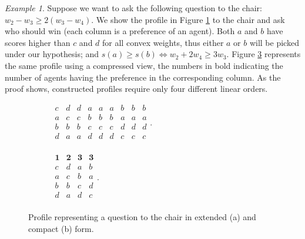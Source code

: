 \documentclass[runningheads]{llncs}
\theoremstyle{remark}
\newtheorem*{example*}{Example}
\begin{document}
\begin{example*}
	Suppose we want to ask the following question to the chair: $w_{2} - w_{3} ≥ 2 (w_{3} - w_{4})$. We show the profile in Figure \ref{fig:profileQstComm} to the chair and ask who should win (each column is a preference of an agent).	Both $a$ and $b$ have scores higher than $c$ and $d$ for all convex weights, thus either $a$ or $b$ will be picked under our hypothesis; and $s(a) ≥ s(b) ⇔ w_2 + 2 w_4 ≥ 3 w_3$.
	Figure \ref{fig:profileQstCommCompact} represents the same profile using a compressed view, the numbers in bold indicating the number of agents having the preference in the corresponding column. As the proof shows, constructed profiles require only four different linear orders.
	\begin{figure}
		\centering
		\begin{subfigure}[b]{0.49\textwidth}
			\begin{center}
				$
				\begin{array}{ccccccccc}
					c&d&d&a&a&a&b&b&b\\
					a&c&c&b&b&b&a&a&a\\
					b&b&b&c&c&c&d&d&d\\
					d&a&a&d&d&d&c&c&c\\
				\end{array}.
				$
			\end{center}
			\caption{}
			\label{fig:profileQstComm}
		\end{subfigure}
		\hfill
		\begin{subfigure}[b]{0.49\textwidth}
			\begin{center}
				$
				\begin{array}{cccc}
					\mathbf{1}&\mathbf{2}&\mathbf{3}&\mathbf{3} \\
					c&d&a&b\\
					a&c&b&a\\
					b&b&c&d\\
					d&a&d&c\\
				\end{array}.
				$
			\end{center}
			\caption{}
			\label{fig:profileQstCommCompact}
		\end{subfigure}
		\caption{Profile representing a question to the chair in extended (a) and compact (b) form.}
	\end{figure}
\end{example*}
\end{document}
